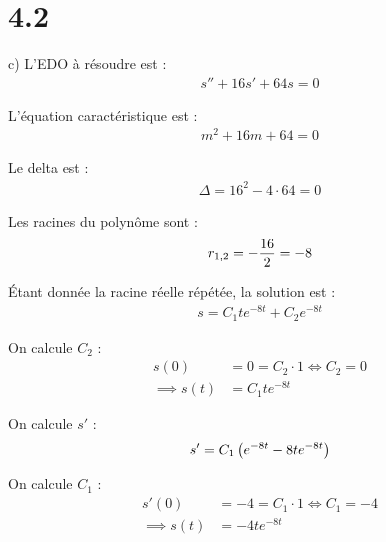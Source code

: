 \section*{4.2}

c) L'EDO à résoudre est :
\begin{align*}
    s'' + 16s' + 64s = 0
\end{align*}

L'équation caractéristique est :
\begin{align*}
    m^2 + 16m + 64 = 0
\end{align*}

Le delta est :
\begin{align*}
    \Delta = 16^2 - 4\cdot64 = 0
\end{align*}

Les racines du polynôme sont :
\begin{align*}
    r_{1,2} = -\dfrac{16}{2} = -8
\end{align*}

Étant donnée la racine réelle répétée, la solution est :
\begin{align*}
    s = C_1 t e^{-8t} +C_2 e^{-8t}
\end{align*}

On calcule $C_2$ :
\begin{align*}
    s(0) &= 0 = C_2\cdot 1\iff C_2 = 0 \\
    \implies s(t) &= C_1 te^{-8t}
\end{align*}

On calcule $s'$ :
\begin{align*}
    s' = C_1\left({e^{-8t} -8te^{-8t}}\right)
\end{align*}

On calcule $C_1$ :
\begin{align*}
    s'(0) &= -4 = C_1\cdot 1\iff C_1 = -4 \\
    \implies s(t) &= -4te^{-8t}
\end{align*}

